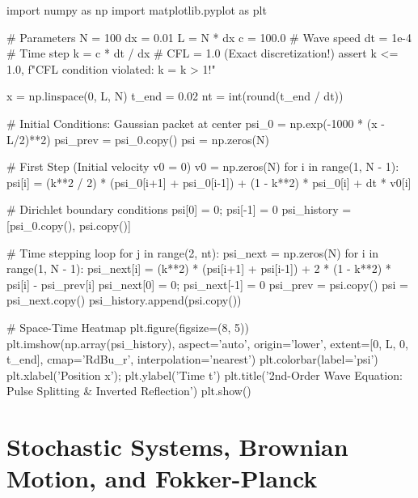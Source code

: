 \documentclass{article}
\begin{document}
\begin{jupytercode}
import numpy as np 
import matplotlib.pyplot as plt

# Parameters
N = 100
dx = 0.01
L = N * dx
c = 100.0             # Wave speed
dt = 1e-4             # Time step
k = c * dt / dx       # CFL = 1.0 (Exact discretization!)
assert k <= 1.0, f"CFL condition violated: k = {k} > 1!"

x = np.linspace(0, L, N)
t_end = 0.02
nt = int(round(t_end / dt))

# Initial Conditions: Gaussian packet at center
psi_0 = np.exp(-1000 * (x - L/2)**2)
psi_prev = psi_0.copy()
psi = np.zeros(N)

# First Step (Initial velocity v0 = 0)
v0 = np.zeros(N)
for i in range(1, N - 1):
    psi[i] = (k**2 / 2) * (psi_0[i+1] + psi_0[i-1]) + (1 - k**2) * psi_0[i] + dt * v0[i]

# Dirichlet boundary conditions
psi[0] = 0; psi[-1] = 0
psi_history = [psi_0.copy(), psi.copy()]

# Time stepping loop
for j in range(2, nt):
    psi_next = np.zeros(N)
    for i in range(1, N - 1):
        psi_next[i] = (k**2) * (psi[i+1] + psi[i-1]) + 2 * (1 - k**2) * psi[i] - psi_prev[i]
    psi_next[0] = 0; psi_next[-1] = 0
    psi_prev = psi.copy()
    psi = psi_next.copy()
    psi_history.append(psi.copy())

# Space-Time Heatmap
plt.figure(figsize=(8, 5))
plt.imshow(np.array(psi_history), aspect='auto', origin='lower',
           extent=[0, L, 0, t_end], cmap='RdBu_r', interpolation='nearest')
plt.colorbar(label='psi')
plt.xlabel('Position x'); plt.ylabel('Time t')
plt.title('2nd-Order Wave Equation: Pulse Splitting & Inverted Reflection')
plt.show()
\end{jupytercode}
\newpage

\section{Stochastic Systems, Brownian Motion, and Fokker-Planck}
\end{document}
